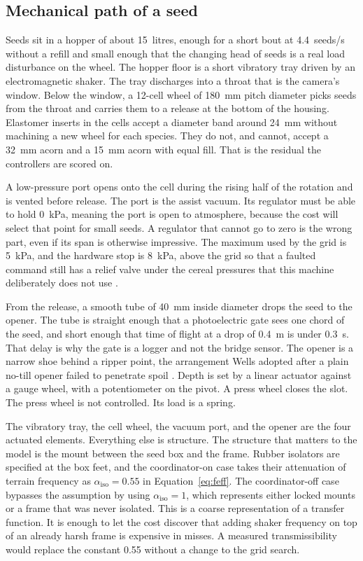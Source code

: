 \subsection{Mechanical path of a seed}

Seeds sit in a hopper of about 15~litres, enough for a short bout at 4.4~seeds/s without a refill and small enough that the changing head of seeds is a real load disturbance on the wheel. The hopper floor is a short vibratory tray driven by an electromagnetic shaker. The tray discharges into a throat that is the camera's window. Below the window, a 12-cell wheel of 180~mm pitch diameter picks seeds from the throat and carries them to a release at the bottom of the housing. Elastomer inserts in the cells accept a diameter band around 24~mm without machining a new wheel for each species. They do not, and cannot, accept a 32~mm acorn and a 15~mm acorn with equal fill. That is the residual the controllers are scored on.

A low-pressure port opens onto the cell during the rising half of the rotation and is vented before release. The port is the assist vacuum. Its regulator must be able to hold 0~kPa, meaning the port is open to atmosphere, because the cost will select that point for small seeds. A regulator that cannot go to zero is the wrong part, even if its span is otherwise impressive. The maximum used by the grid is 5~kPa, and the hardware stop is 8~kPa, above the grid so that a faulted command still has a relief valve under the cereal pressures that this machine deliberately does not use \cite{karayel2004,li2025drum}.

From the release, a smooth tube of 40~mm inside diameter drops the seed to the opener. The tube is straight enough that a photoelectric gate sees one chord of the seed, and short enough that time of flight at a drop of 0.4~m is under 0.3~s. That delay is why the gate is a logger and not the bridge sensor. The opener is a narrow shoe behind a ripper point, the arrangement Wells adopted after a plain no-till opener failed to penetrate spoil \cite{wells1990}. Depth is set by a linear actuator against a gauge wheel, with a potentiometer on the pivot. A press wheel closes the slot. The press wheel is not controlled. Its load is a spring.

The vibratory tray, the cell wheel, the vacuum port, and the opener are the four actuated elements. Everything else is structure. The structure that matters to the model is the mount between the seed box and the frame. Rubber isolators are specified at the box feet, and the coordinator-on case takes their attenuation of terrain frequency as $\alpha_{\mathrm{iso}}=0.55$ in Equation~\eqref{eq:feff}. The coordinator-off case bypasses the assumption by using $\alpha_{\mathrm{iso}}=1$, which represents either locked mounts or a frame that was never isolated. This is a coarse representation of a transfer function. It is enough to let the cost discover that adding shaker frequency on top of an already harsh frame is expensive in misses. A measured transmissibility would replace the constant 0.55 without a change to the grid search.

